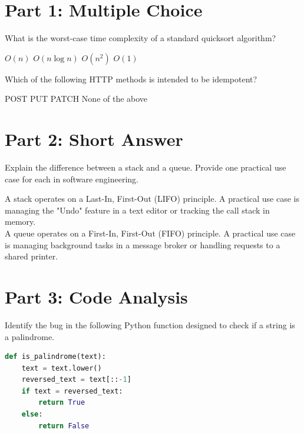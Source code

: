 \documentclass[12pt, answers, addpoints]{exam}
\begin{document}
\begin{questions}

\section*{Part 1: Multiple Choice}

\question[5] What is the worst-case time complexity of a standard quicksort algorithm?
\begin{choices}
    \choice $O(n)$
    \choice $O(n \log n)$
    \CorrectChoice $O(n^2)$
    \choice $O(1)$
\end{choices}

\question[5] Which of the following HTTP methods is intended to be idempotent?
\begin{checkboxes}
    \choice POST
    \CorrectChoice PUT
    \choice PATCH
    \choice None of the above
\end{checkboxes}


\section*{Part 2: Short Answer}

\question[10] Explain the difference between a stack and a queue. Provide one practical use case for each in software engineering.
\begin{solution}[2.5in]
    A stack operates on a Last-In, First-Out (LIFO) principle. A practical use case is managing the "Undo" feature in a text editor or tracking the call stack in memory.\\
    
    A queue operates on a First-In, First-Out (FIFO) principle. A practical use case is managing background tasks in a message broker or handling requests to a shared printer.
\end{solution}

\section*{Part 3: Code Analysis}

\question[15] Identify the bug in the following Python function designed to check if a string is a palindrome.

\begin{lstlisting}[language=Python]
def is_palindrome(text):
    text = text.lower()
    reversed_text = text[::-1]
    if text = reversed_text:
        return True
    else:
        return False
\end{lstlisting}


\end{questions}
\end{document}
